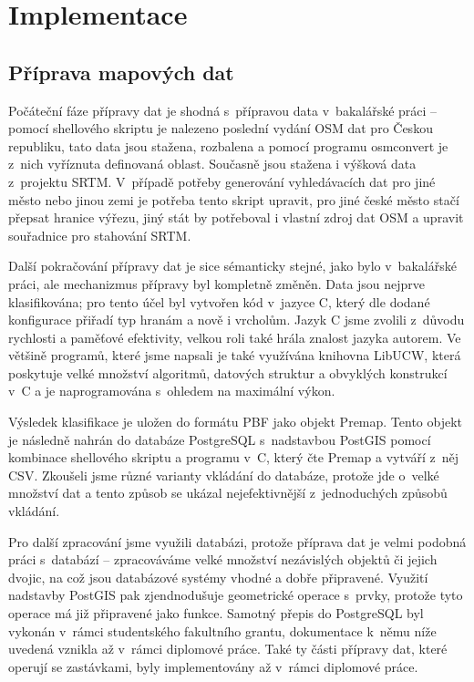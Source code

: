\chapter{Implementace}
\label{ch:implementace}
\section{Příprava mapových dat}
\label{ch:implementace:OSM}
Počáteční fáze přípravy dat je shodná s~přípravou data v~bakalářské práci --
pomocí shellového skriptu je nalezeno poslední vydání OSM dat pro Českou
republiku, tato data jsou stažena, rozbalena a pomocí programu osmconvert je
z~nich vyříznuta definovaná oblast. Současně jsou stažena i výšková data
z~projektu SRTM. V~případě potřeby generování vyhledávacích dat pro jiné město
nebo jinou zemi je potřeba tento skript upravit, pro jiné české město stačí
přepsat hranice výřezu, jiný stát by potřeboval i vlastní zdroj dat OSM a
upravit souřadnice pro stahování SRTM. 

Další pokračování přípravy
dat je sice sémanticky stejné, jako bylo v~bakalářské práci, ale mechanizmus
přípravy byl kompletně změněn. Data jsou nejprve klasifikována; pro tento účel
byl vytvořen kód v~jazyce C, který dle dodané konfigurace přiřadí typ hranám a
nově i vrcholům. Jazyk C jsme zvolili z~důvodu rychlosti a paměťové efektivity,
velkou roli také hrála znalost jazyka autorem. Ve většině programů, které jsme
napsali je také využívána knihovna LibUCW\cite{LibUCW}, která poskytuje velké
množství algoritmů, datových struktur a obvyklých konstrukcí v~C a je
naprogramována s~ohledem na maximální výkon.

Výsledek klasifikace je uložen do formátu PBF jako objekt Premap. Tento objekt
je následně nahrán do databáze PostgreSQL s~nadstavbou PostGIS pomocí kombinace
shellového skriptu a programu v~C, který čte Premap a vytváří z~něj CSV.
Zkoušeli jsme různé varianty vkládání do databáze, protože jde o~velké množství
dat a tento způsob se ukázal nejefektivnější z~jednoduchých způsobů vkládání. 

Pro další zpracování jsme využili databázi, protože příprava dat je velmi
podobná práci s~databází -- zpracováváme velké množství nezávislých objektů či
jejich dvojic, na což jsou databázové systémy vhodné a dobře připravené. Využití
nadstavby PostGIS pak zjendnodušuje geometrické operace s~prvky, protože tyto
operace má již připravené jako funkce. Samotný přepis do PostgreSQL byl vykonán
v~rámci studentského fakultního grantu, dokumentace k~němu níže uvedená vznikla
až v~rámci diplomové práce. Také ty části přípravy dat, které operují se
zastávkami, byly implementovány až v~rámci diplomové práce.

